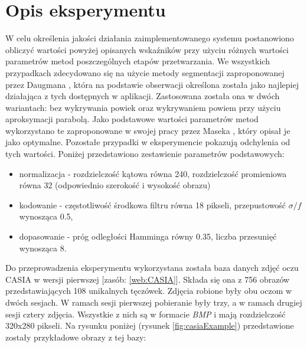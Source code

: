 \documentclass[10pt,polish,a4paper,oneside]{ppfcmthesis}
\begin{document}
\section{Opis eksperymentu}

W celu określenia jakości działania zaimplementowanego systemu postanowiono obliczy\'c wartości powyżej opisanych wska\'zników
przy użyciu różnych wartości parametrów metod poszczególnych etapów przetwarzania. We wszystkich przypadkach zdecydowano
się na użycie metody segmentacji zaproponowanej przez Daugmana \cite{DaugmanHowIrisRecognitionWorks}, która na podstawie obserwacji
określona została jako najlepiej działająca z tych dostępnych w aplikacji. Zastosowana została ona w dwóch wariantach:
bez wykrywania powiek oraz wykrywaniem powiem przy użyciu aproksymacji parabolą. Jako podstawowe wartości parametrów
metod wykorzystano te zaproponowane w swojej pracy przez Maseka \cite{masek}, który opisał je jako optymalne. Pozostałe
przypadki w eksperymencie pokazują odchylenia od tych wartości. Poniżej przedstawiono zestawienie parametrów podstawowych:

\begin{itemize}
  \item normalizacja - rozdzielczoś\'c kątowa równa 240, rozdzielczoś\'c promieniowa równa 32 (odpowiednio szerokoś\'c i wysokoś\'c obrazu)
  \item kodowanie - częstotliwoś\'c środkowa filtru równa 18 pikseli, przepustowoś\'c $\mathit{\sigma/f}$ wynosząca 0.5,
  \item dopasowanie - próg odległości Hamminga równy 0.35, liczba przesunię\'c wynosząca 8.
\end{itemize}

Do przeprowadzenia eksperymentu wykorzystana została baza danych zdję\'c oczu CASIA w wersji pierwszej [zasób: \ref{web:CASIA}].
Składa się ona z 756 obrazów przedstawiających 108 unikalnych tęczówek. Zdjęcia robione były obu oczom w dwóch
sesjach. W ramach sesji pierwszej pobieranie były trzy, a w ramach drugiej sesji cztery zdjęcia. Wszystkie z nich
są w formacie \textit{BMP} i mają rozdzielczoś\'c 320x280 pikseli. Na rysunku poniżej (rysunek \ref{fig:casiaExample})
przedstawione zostały przykładowe obrazy z tej bazy:\newline
\end{document}
